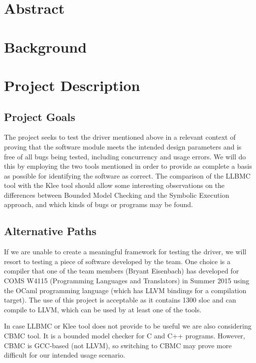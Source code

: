 \documentclass[10pt]{article}
\begin{document}
    \section{Abstract}
    
    
    \section{Background}
    
    
    
    
    
    \section{Project Description}

    \subsection{Project Goals}
    The project seeks to test the driver mentioned above in a relevant context of proving
    that the software module meets the intended design parameters and is free of all bugs
    being tested, including concurrency and usage errors.
    We will do this by employing the two tools mentioned in order to provide as complete
    a basis as possible for identifying the software as correct.
    The comparison of the LLBMC tool with the Klee tool should allow some interesting 
    observations on the differences between Bounded Model Checking
    and the Symbolic Execution approach, and which kinds of bugs or programs may be found.
    
    \subsection{Alternative Paths}
    If we are unable to create a meaningful framework for testing the driver, 
    we will resort to testing a piece of software developed by the team.
    One choice is a compiler that one of the team members (Bryant Eisenbach) has developed
    for COMS W4115 (Programming Languages and Translators) in Summer 2015 using the OCaml
    programming language (which has LLVM bindings for a compilation target).
    The use of this project is acceptable as it contains 1300 sloc and can compile to LLVM,
    which can be used by at least one of the tools.
    \par
    In case LLBMC or Klee tool does not provide to be useful we are also considering CBMC tool.
    It is a bounded model checker for C and C++ programs.
    However, CBMC is GCC-based (not LLVM), so switching to CBMC may prove more difficult 
    for our intended usage scenario.
    
    \pagebreak
    \small
    {}
    
\end{document}

